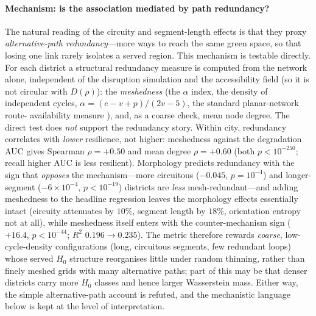 \documentclass[sn-mathphys-num,pdflatex]{sn-jnl}
\newcommand{\Drho}{D(\rho)}
\begin{document}
\paragraph{Mechanism: is the association mediated by path redundancy?} The natural
reading of the circuity and segment-length effects is that they proxy
\emph{alternative-path redundancy}---more ways to reach the same green space, so that
losing one link rarely isolates a served region. This mechanism is testable directly.
For each district a structural redundancy measure is computed from the network alone,
independent of the disruption simulation and the accessibility field (so it is not
circular with $\Drho$): the \emph{meshedness} (the $\alpha$ index, the density of
independent cycles, $\alpha=(e-v+p)/(2v-5)$, the standard planar-network route-
availability measure \citep{barthelemy2011spatial}), and, as a coarse check, mean
node degree. The direct test does \emph{not} support the redundancy story. Within
city, redundancy correlates with \emph{lower} resilience, not higher: meshedness
against the degradation AUC gives Spearman $\rho=+0.50$ and mean degree $\rho=+0.60$
(both $p<10^{-250}$; recall higher AUC is less resilient). Morphology predicts
redundancy with the sign that \emph{opposes} the mechanism---more circuitous
($-0.045$, $p=10^{-4}$) and longer-segment ($-6\times10^{-4}$, $p<10^{-19}$) districts
are \emph{less} mesh-redundant---and adding meshedness to the headline regression
leaves the morphology effects essentially intact (circuity attenuates by $10\%$,
segment length by $18\%$, orientation entropy not at all), while meshedness itself
enters with the counter-mechanism sign ($+16.4$, $p<10^{-44}$; $R^2$ $0.196\to0.235$).
The metric therefore rewards \emph{coarse}, low-cycle-density configurations (long,
circuitous segments, few redundant loops) whose served $H_0$ structure reorganises
little under random thinning, rather than finely meshed grids with many alternative
paths; part of this may be that denser districts carry more $H_0$ classes and hence
larger Wasserstein mass. Either way, the simple alternative-path account is refuted,
and the mechanistic language below is kept at the level of interpretation.
\end{document}
